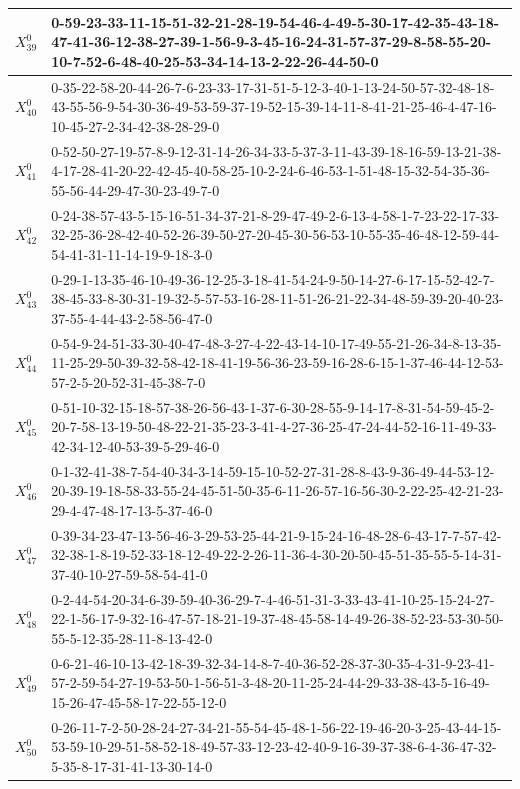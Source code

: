 \begin{landscape}
{\begin{tabularx}{\linewidth}{|c|X|}
        $X_{39}^{0}$ & 0-59-23-33-11-15-51-32-21-28-19-54-46-4-49-5-30-17-42-35-43-18-47-41-36-12-38-27-39-1-56-9-3-45-16-24-31-57-37-29-8-58-55-20-10-7-52-6-48-40-25-53-34-14-13-2-22-26-44-50-0 \\ \hline
        $X_{40}^{0}$ & 0-35-22-58-20-44-26-7-6-23-33-17-31-51-5-12-3-40-1-13-24-50-57-32-48-18-43-55-56-9-54-30-36-49-53-59-37-19-52-15-39-14-11-8-41-21-25-46-4-47-16-10-45-27-2-34-42-38-28-29-0 \\ \hline
        $X_{41}^{0}$ & 0-52-50-27-19-57-8-9-12-31-14-26-34-33-5-37-3-11-43-39-18-16-59-13-21-38-4-17-28-41-20-22-42-45-40-58-25-10-2-24-6-46-53-1-51-48-15-32-54-35-36-55-56-44-29-47-30-23-49-7-0 \\ \hline
        $X_{42}^{0}$ & 0-24-38-57-43-5-15-16-51-34-37-21-8-29-47-49-2-6-13-4-58-1-7-23-22-17-33-32-25-36-28-42-40-52-26-39-50-27-20-45-30-56-53-10-55-35-46-48-12-59-44-54-41-31-11-14-19-9-18-3-0 \\ \hline
        $X_{43}^{0}$ & 0-29-1-13-35-46-10-49-36-12-25-3-18-41-54-24-9-50-14-27-6-17-15-52-42-7-38-45-33-8-30-31-19-32-5-57-53-16-28-11-51-26-21-22-34-48-59-39-20-40-23-37-55-4-44-43-2-58-56-47-0 \\ \hline
        $X_{44}^{0}$ & 0-54-9-24-51-33-30-40-47-48-3-27-4-22-43-14-10-17-49-55-21-26-34-8-13-35-11-25-29-50-39-32-58-42-18-41-19-56-36-23-59-16-28-6-15-1-37-46-44-12-53-57-2-5-20-52-31-45-38-7-0 \\ \hline
        $X_{45}^{0}$ & 0-51-10-32-15-18-57-38-26-56-43-1-37-6-30-28-55-9-14-17-8-31-54-59-45-2-20-7-58-13-19-50-48-22-21-35-23-3-41-4-27-36-25-47-24-44-52-16-11-49-33-42-34-12-40-53-39-5-29-46-0 \\ \hline
        $X_{46}^{0}$ & 0-1-32-41-38-7-54-40-34-3-14-59-15-10-52-27-31-28-8-43-9-36-49-44-53-12-20-39-19-18-58-33-55-24-45-51-50-35-6-11-26-57-16-56-30-2-22-25-42-21-23-29-4-47-48-17-13-5-37-46-0 \\ \hline
        $X_{47}^{0}$ & 0-39-34-23-47-13-56-46-3-29-53-25-44-21-9-15-24-16-48-28-6-43-17-7-57-42-32-38-1-8-19-52-33-18-12-49-22-2-26-11-36-4-30-20-50-45-51-35-55-5-14-31-37-40-10-27-59-58-54-41-0 \\ \hline
        $X_{48}^{0}$ & 0-2-44-54-20-34-6-39-59-40-36-29-7-4-46-51-31-3-33-43-41-10-25-15-24-27-22-1-56-17-9-32-16-47-57-18-21-19-37-48-45-58-14-49-26-38-52-23-53-30-50-55-5-12-35-28-11-8-13-42-0 \\ \hline
        $X_{49}^{0}$ & 0-6-21-46-10-13-42-18-39-32-34-14-8-7-40-36-52-28-37-30-35-4-31-9-23-41-57-2-59-54-27-19-53-50-1-56-51-3-48-20-11-25-24-44-29-33-38-43-5-16-49-15-26-47-45-58-17-22-55-12-0 \\ \hline
        $X_{50}^{0}$ & 0-26-11-7-2-50-28-24-27-34-21-55-54-45-48-1-56-22-19-46-20-3-25-43-44-15-53-59-10-29-51-58-52-18-49-57-33-12-23-42-40-9-16-39-37-38-6-4-36-47-32-5-35-8-17-31-41-13-30-14-0 \\ \hline
    \end{tabularx}
    }

\end{landscape}
\pagebreak


